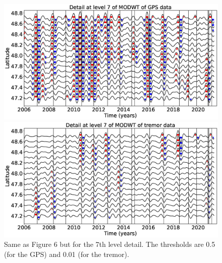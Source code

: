 \documentclass{article}
\begin{document}
\begin{figure}
\noindent\includegraphics[width=\textwidth, trim={0cm 0cm 0cm 0cm},clip]{figures/GPS_longer_detail_7.eps}

\noindent\includegraphics[width=\textwidth, trim={0cm 0cm 0cm 0cm},clip]{figures/tremor_longer_detail_7.eps}
\caption{Same as Figure 6 but for the 7th level detail. The thresholds are 0.5 (for the GPS) and 0.01 (for the tremor).}
\label{pngfiguresample}
\end{figure}
\end{document}
